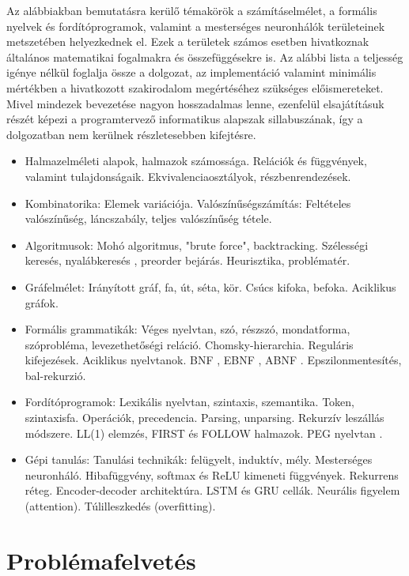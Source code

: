 \documentclass[twoside, 12pt]{report}
\begin{document}
Az alábbiakban bemutatásra kerülő témakörök a számításelmélet, a formális nyelvek és fordítóprogramok, valamint a mesterséges neuronhálók területeinek metszetében helyezkednek el. Ezek a területek számos esetben hivatkoznak általános matematikai fogalmakra és összefüggésekre is. Az alábbi lista a teljesség igénye nélkül foglalja össze a dolgozat, az implementáció valamint minimális mértékben a hivatkozott szakirodalom megértéséhez szükséges előismereteket. Mivel mindezek bevezetése nagyon hosszadalmas lenne, ezenfelül elsajátításuk részét képezi a programtervező informatikus alapszak sillabuszának, így a dolgozatban nem kerülnek részletesebben kifejtésre.

\begin{itemize}[noitemsep]
  \item Halmazelméleti alapok, halmazok számossága. Relációk és függvények, valamint tulajdonságaik. Ekvivalenciaosztályok, részbenrendezések.
  \item Kombinatorika: Elemek variációja. Valószínűségszámítás: Feltételes valószínűség, láncszabály, teljes valószínűség tétele.
  \item Algoritmusok: Mohó algoritmus, "brute force", backtracking. Szélességi keresés, nyalábkeresés \parencite{Red77a}, preorder bejárás. Heurisztika, problématér.
  \item Gráfelmélet: Irányított gráf, fa, út, séta, kör. Csúcs kifoka, befoka. Aciklikus gráfok.
  \item Formális grammatikák: Véges nyelvtan, szó, részszó, mondatforma, szóprobléma, levezethetőségi reláció. Chomsky-hierarchia. Reguláris kifejezések. Aciklikus nyelvtanok. BNF \parencite{Bac59a}, EBNF \parencite{Wir77a}, ABNF \parencite{CO08a}. Epszilonmentesítés, bal-rekurzió.
  \item Fordítóprogramok: Lexikális nyelvtan, szintaxis, szemantika. Token, szintaxisfa. Operációk, precedencia. Parsing, unparsing. Rekurzív leszállás módszere. LL(1) elemzés, FIRST és FOLLOW halmazok. PEG nyelvtan \parencite{For04a}.
  \item Gépi tanulás: Tanulási technikák: felügyelt, induktív, mély. Mesterséges neuronháló. Hibafüggvény, softmax és ReLU kimeneti függvények. Rekurrens réteg. Encoder-decoder architektúra. LSTM \parencite{HS97a} és GRU \parencite{Cho+14a} cellák. Neurális figyelem (attention). Túlilleszkedés (overfitting).
\end{itemize}

\section{Problémafelvetés}
\end{document}
